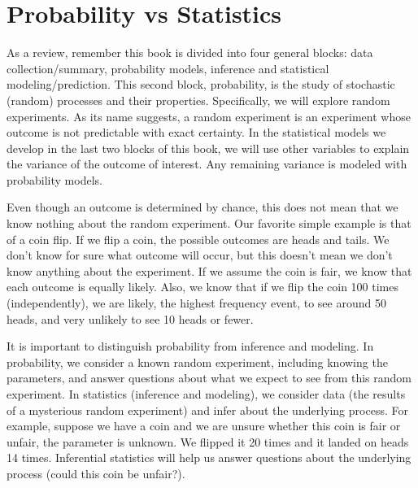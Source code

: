 \documentclass[
  letterpaper,
  DIV=11,
  numbers=noendperiod]{scrreprt}
\begin{document}
\section{Probability vs Statistics}\label{probability-vs-statistics}

As a review, remember this book is divided into four general blocks:
data collection/summary, probability models, inference and statistical
modeling/prediction. This second block, probability, is the study of
stochastic (random) processes and their properties. Specifically, we
will explore random experiments. As its name suggests, a random
experiment is an experiment whose outcome is not predictable with exact
certainty. In the statistical models we develop in the last two blocks
of this book, we will use other variables to explain the variance of the
outcome of interest. Any remaining variance is modeled with probability
models.

Even though an outcome is determined by chance, this does not mean that
we know nothing about the random experiment. Our favorite simple example
is that of a coin flip. If we flip a coin, the possible outcomes are
heads and tails. We don't know for sure what outcome will occur, but
this doesn't mean we don't know anything about the experiment. If we
assume the coin is fair, we know that each outcome is equally likely.
Also, we know that if we flip the coin 100 times (independently), we are
likely, the highest frequency event, to see around 50 heads, and very
unlikely to see 10 heads or fewer.

It is important to distinguish probability from inference and modeling.
In probability, we consider a known random experiment, including knowing
the parameters, and answer questions about what we expect to see from
this random experiment. In statistics (inference and modeling), we
consider data (the results of a mysterious random experiment) and infer
about the underlying process. For example, suppose we have a coin and we
are unsure whether this coin is fair or unfair, the parameter is
unknown. We flipped it 20 times and it landed on heads 14 times.
Inferential statistics will help us answer questions about the
underlying process (could this coin be unfair?).
\end{document}

